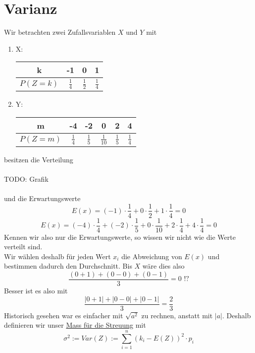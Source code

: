 \documentclass{report}
\begin{document}
\section{Varianz}
Wir betrachten zwei Zufallsvariablen $X$ und $Y$ mit
\begin{enumerate}
\item
X:
\begin{center}\begin{tabular}{c | c c c}
k & -1 & 0 & 1\\
\hline
$P(Z=k)$ & $\frac{1}{4}$ & $\frac{1}{2}$ & $\frac{1}{4}$
\end{tabular}\end{center}
\item
Y:
\begin{center}\begin{tabular}{c | c c c c c}
m & -4 & -2 & 0 & 2 & 4\\
\hline
$P(Z=m)$ & $\frac{1}{4}$ & $\frac{1}{5}$ & $\frac{1}{10}$ & $\frac{1}{5}$ & $\frac{1}{4}$
\end{tabular}\end{center}
\end{enumerate}
besitzen die Verteilung
\\\\TODO: Grafik\\\\
und die Erwartungswerte
\begin{equation}
E(x) = (-1) \cdot \frac{1}{4} + 0 \cdot \frac{1}{2} + 1 \cdot \frac{1}{4} = 0
\end{equation}
\begin{equation}
E(x) = (-4) \cdot \frac{1}{4} + (-2) \cdot \frac{1}{5} + 0 \cdot \frac{1}{10} + 2 \cdot \frac{1}{4} + 4 \cdot \frac{1}{4} = 0
\end{equation}
Kennen wir also nur die Erwartungswerte, so wissen wir nicht wie die Werte verteilt sind.\\
Wir wählen deshalb für jeden Wert $x_i$ die Abweichung von $E(x)$ und bestimmen dadurch den Durchschnitt. Bis $X$ wäre dies also
\begin{equation}
\frac{(0+1) + (0-0) + (0-1)}{3} = 0 \mbox{ !?}
\end{equation}
Besser ist es also mit
\begin{equation}
\frac{|0+1| + |0-0| + |0-1|}{3} = \frac{2}{3}
\end{equation}
Historisch gesehen war es einfacher mit $\sqrt{a^2}$ zu rechnen, anstatt mit $|a|$. Deshalb definieren wir unser \underline{Mass für die Streuung} mit
\begin{equation}
\sigma^2 := Var(Z) := \sum_{i=1}^n{(k_i - E(Z))^2 \cdot p_i}
\end{equation}
\end{document}
